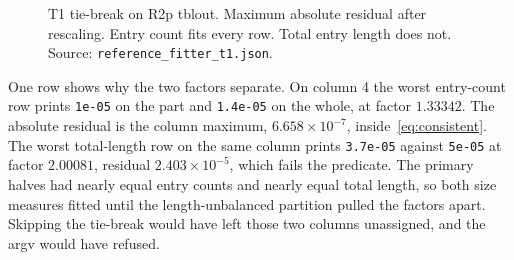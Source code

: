 \documentclass[letterpaper,twocolumn,10pt]{article}
\begin{document}
\begin{figure}[t]
\centering

\caption{T1 tie-break on R2p tblout.
Maximum absolute residual after rescaling.
Entry count fits every row.
Total entry length does not.
Source: \texttt{reference\_fitter\_t1.json}.}
\label{fig:residuals}
\end{figure}

One row shows why the two factors separate.
On column 4 the worst entry-count row prints
\texttt{1e-05}
on the part and
\texttt{1.4e-05}
on the whole, at factor
$1.33342$.
The absolute residual is the column maximum,
$6.658\times 10^{-7}$,
inside~\eqref{eq:consistent}.
The worst total-length row on the same column prints
\texttt{3.7e-05}
against
\texttt{5e-05}
at factor
$2.00081$,
residual
$2.403\times 10^{-5}$,
which fails the predicate.
The primary halves had nearly equal entry counts and nearly equal total length, so both size measures fitted until the length-unbalanced partition pulled the factors apart.
Skipping the tie-break would have left those two columns unassigned, and the argv would have refused.
\end{document}
